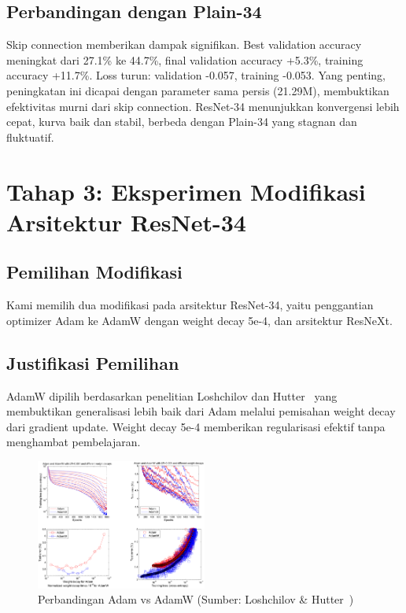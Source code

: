 \documentclass[11pt,a4paper]{article}
\begin{document}
\subsection{Perbandingan dengan Plain-34}

Skip connection memberikan dampak signifikan. Best validation accuracy meningkat dari 27.1\% ke 44.7\%, final validation accuracy +5.3\%, training accuracy +11.7\%. Loss turun: validation -0.057, training -0.053. Yang penting, peningkatan ini dicapai dengan parameter sama persis (21.29M), membuktikan efektivitas murni dari skip connection. ResNet-34 menunjukkan konvergensi lebih cepat, kurva baik dan stabil, berbeda dengan Plain-34 yang stagnan dan fluktuatif.

\section{Tahap 3: Eksperimen Modifikasi Arsitektur ResNet-34}
\subsection{Pemilihan Modifikasi}
Kami memilih dua modifikasi pada arsitektur ResNet-34, yaitu penggantian optimizer Adam ke AdamW dengan weight decay 5e-4, dan arsitektur ResNeXt.

\subsection{Justifikasi Pemilihan}
AdamW dipilih berdasarkan penelitian Loshchilov dan Hutter~\cite{loshchilov2017decoupled} yang membuktikan generalisasi lebih baik dari Adam melalui pemisahan weight decay dari gradient update. Weight decay 5e-4 memberikan regularisasi efektif tanpa menghambat pembelajaran.

\begin{figure}[h]
\centering
\includegraphics[width=0.5\textwidth]{Figure/tahap-3-adamw-comparison.png}
\caption{Perbandingan Adam vs AdamW (Sumber: Loshchilov \& Hutter~\cite{loshchilov2017decoupled})}
\label{fig:adamw}
\end{figure}
\end{document}
